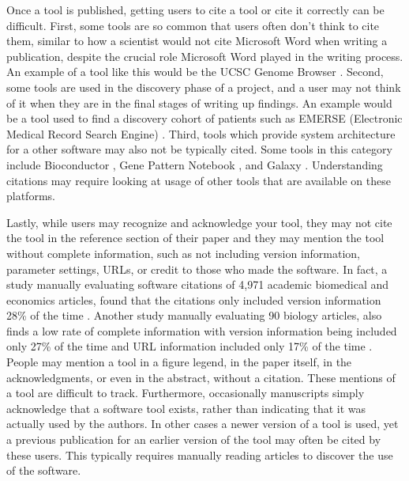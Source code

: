 \documentclass{article}
\begin{document}
Once a tool is published, getting users to cite a tool or cite it correctly can be difficult. First, some tools are so common that users often don't think to cite them, similar to how a scientist would not cite Microsoft Word when writing a publication, despite the crucial role Microsoft Word played in the writing process. An example of a tool like this would be the UCSC Genome Browser \cite{ucsc, kent_human_2002}. Second, some tools are used in the discovery phase of a project, and a user may not think of it when they are in the final stages of writing up findings. An example would be a tool used to find a discovery cohort of patients such as EMERSE (Electronic Medical Record Search Engine) \cite{hanauer_supporting_2015}. Third, tools which provide system architecture for a other software may also not be typically cited. Some tools in this category include Bioconductor \cite{bioconductor}, Gene Pattern Notebook \cite{reich_genepattern_2017}, and Galaxy \cite{the_galaxy_community_galaxy_2022}. Understanding citations may require looking at usage of other tools that are available on these platforms.

Lastly, while users may recognize and acknowledge your tool, they may not cite the tool in the reference section of their paper and they may mention the tool without complete information, such as not including version information, parameter settings, URLs, or credit to those who made the software.  In fact, a study manually evaluating software citations of 4,971 academic biomedical and economics articles, found that the citations only included version information  28\% of the time \cite{howison_software_2016}.  Another study manually evaluating 90 biology articles, also finds a low rate of complete information with version information being included only 27\% of the time and URL information included only 17\% of the time \cite{du_softcite_2021}. People may mention a tool in a figure legend, in the paper itself, in the acknowledgments, or even in the abstract, without a citation. These mentions of a tool are difficult to track. Furthermore, occasionally manuscripts simply acknowledge that a software tool exists, rather than indicating that it was actually used by the authors. In other cases a newer version of a tool is used, yet a previous publication for an earlier version of the tool may often be cited by these users. This typically requires manually reading articles to discover the use of the software. 
\end{document}
